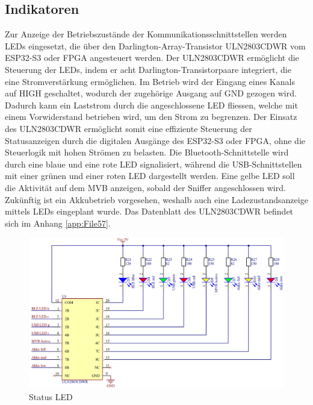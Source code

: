 \subsection{Indikatoren}
\label{subsec:Indikatoren}
Zur Anzeige der Betriebszustände der Kommunikationsschnittstellen werden LEDs eingesetzt, die über den Darlington-Array-Transistor ULN2803CDWR vom ESP32-S3 oder FPGA angesteuert werden. Der ULN2803CDWR ermöglicht die Steuerung der LEDs, indem er acht Darlington-Transistorpaare integriert, die eine Stromverstärkung ermöglichen. Im Betrieb wird der Eingang eines Kanals auf HIGH geschaltet, wodurch der zugehörige Ausgang auf GND gezogen wird. Dadurch kann ein Laststrom durch die angeschlossene LED fliessen, welche mit einem Vorwiderstand betrieben wird, um den Strom zu begrenzen. Der Einsatz des ULN2803CDWR ermöglicht somit eine effiziente Steuerung der Statusanzeigen durch die digitalen Ausgänge des ESP32-S3 oder FPGA, ohne die Steuerlogik mit hohen Strömen zu belasten. Die Bluetooth-Schnittstelle wird durch eine blaue und eine rote LED signalisiert, während die USB-Schnittstellen mit einer grünen und einer roten LED dargestellt werden. Eine gelbe LED soll die Aktivität auf dem MVB anzeigen,  sobald der Sniffer angeschlossen wird. Zukünftig ist ein Akkubetrieb vorgesehen, weshalb auch eine Ladezustandsanzeige mittels LEDs eingeplant wurde. 
Das Datenblatt des ULN2803CDWR befindet sich im Anhang \ref{app:File57}.
\begin{figure}
    \centering
    \includegraphics[width=0.9\linewidth]{Figures/Chap3/Schematics/Indicator_LEDs.png}
    \caption{Status LED}
    \label{fig:StateLED}
\end{figure}

